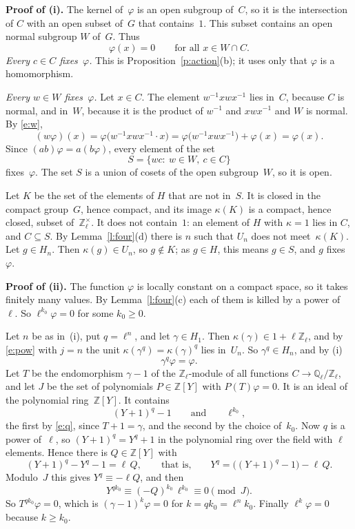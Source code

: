\documentclass[11pt,a4paper]{article}
\newcommand{\Q}{\mathbb{Q}}
\newcommand{\Z}{\mathbb{Z}}
\newcommand{\QZ}{\Q_\ell/\Z_\ell}
\newcommand{\m}[1]{\mbox{$#1$}}        %
\newcommand{\subhead}[1]{\par\addvspace{9pt plus 2pt}\Needspace{4\baselineskip}\noindent\textbf{#1}\enspace\ignorespaces}
\theoremstyle{plainx}
\theoremstyle{uprightx}
\renewcommand{\qedsymbol}{{\setlength{\fboxsep}{0pt}\setlength{\fboxrule}{0.5pt}\fbox{\rule{0pt}{0.46em}\hspace{0.46em}}}}
\begin{document}
\subhead{Proof of (i).} The kernel of~$\varphi$ is an open subgroup of~$C$, so it is the intersection of $C$ with
an open subset of~$G$ that contains~$1$. This subset contains an open normal subgroup $W$ of~$G$. Thus
\begin{equation}\label{e:w}
\varphi(x)=0\qquad\text{for all }x\in W\cap C .
\end{equation}
\emph{Every \m{c\in C} fixes~$\varphi$.} This is Proposition~\ref{p:action}(b); it uses only that $\varphi$ is a
homomorphism.

\emph{Every \m{w\in W} fixes~$\varphi$.} Let \m{x\in C}. The element \m{w^{-1}xwx^{-1}} lies in~$C$, because $C$ is
normal, and in~$W$, because it is the product of $w^{-1}$ and \m{xwx^{-1}} and $W$ is normal. By \eqref{e:w},
\[
(w\varphi)(x)=\varphi\bigl(w^{-1}xwx^{-1}\cdot x\bigr)=\varphi\bigl(w^{-1}xwx^{-1}\bigr)+\varphi(x)=\varphi(x).
\]
Since \m{(ab)\varphi=a(b\varphi)}, every element of the set
\[
S=\{wc:\ w\in W,\ c\in C\}
\]
fixes~$\varphi$. The set $S$ is a union of cosets of the open subgroup~$W$, so it is open.

Let $K$ be the set of the elements of $H$ that are not in~$S$. It is closed in the compact group~$G$, hence compact,
and its image $\kappa(K)$ is a compact, hence closed, subset of~$\Z_\ell^\times$. It does not contain~$1$: an
element of $H$ with \m{\kappa=1} lies in $C$, and \m{C\subseteq S}. By Lemma~\ref{l:four}(d) there is $n$ such that
$U_n$ does not meet~$\kappa(K)$. Let \m{g\in H_n}. Then \m{\kappa(g)\in U_n}, so \m{g\notin K}; as \m{g\in H}, this
means \m{g\in S}, and $g$ fixes~$\varphi$.

\subhead{Proof of (ii).} The function $\varphi$ is locally constant on a compact space, so it takes finitely many
values. By Lemma~\ref{l:four}(c) each of them is killed by a power of~$\ell$. So \m{\ell^{k_0}\varphi=0} for some
\m{k_0\ge0}.

Let $n$ be as in~(i), put \m{q=\ell^n}, and let \m{\gamma\in H_1}. Then \m{\kappa(\gamma)\in1+\ell\Z_\ell}, and by
\eqref{e:pow} with \m{j=n} the unit \m{\kappa(\gamma^q)=\kappa(\gamma)^{q}} lies in~$U_n$. So \m{\gamma^q\in H_n}, and
by (i)
\begin{equation}\label{e:q}
\gamma^q\varphi=\varphi .
\end{equation}
Let $T$ be the endomorphism \m{\gamma-1} of the $\Z_\ell$-module of all functions \m{C\to\QZ}, and let $J$ be the
set of polynomials \m{P\in\Z[Y]} with \m{P(T)\varphi=0}. It is an ideal of the polynomial ring~$\Z[Y]$. It contains
\[
(Y+1)^q-1\qquad\text{and}\qquad\ell^{k_0},
\]
the first by \eqref{e:q}, since \m{T+1=\gamma}, and the second by the choice of~$k_0$. Now $q$ is a power of~$\ell$,
so \m{(Y+1)^q=Y^q+1} in the polynomial ring over the field with $\ell$ elements. Hence there is \m{Q\in\Z[Y]} with
\[
(Y+1)^q-Y^q-1=\ell\,Q ,\qquad\text{that is,}\qquad Y^q=\bigl((Y+1)^q-1\bigr)-\ell\,Q .
\]
Modulo~$J$ this gives \m{Y^q\equiv-\ell Q}, and then
\[
Y^{qk_0}\equiv(-Q)^{k_0}\,\ell^{k_0}\equiv0\pmod J .
\]
So \m{T^{qk_0}\varphi=0}, which is \m{(\gamma-1)^k\varphi=0} for \m{k=qk_0=\ell^nk_0}. Finally \m{\ell^k\varphi=0}
because \m{k\ge k_0}. \hfill\qedsymbol
\end{document}
